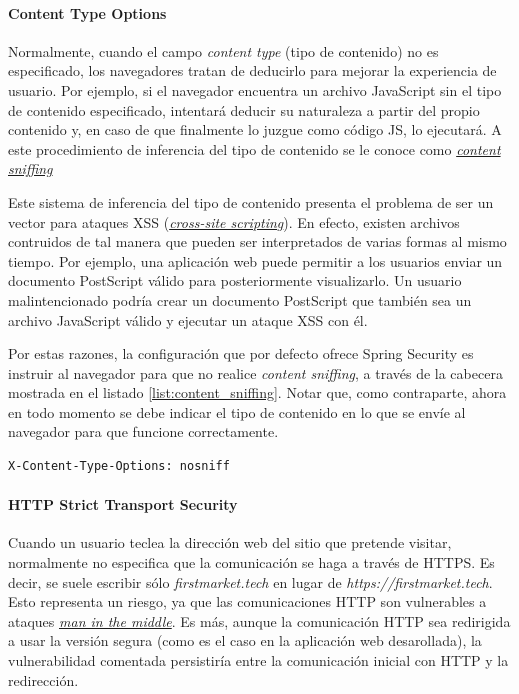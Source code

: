 \documentclass[a4paper]{article}
\begin{document}
	\paragraph{Content Type Options}
	Normalmente, cuando el campo \emph{content type} (tipo de contenido) no es especificado, los navegadores tratan de deducirlo para mejorar la experiencia de usuario. Por ejemplo, si el navegador encuentra un archivo JavaScript sin el tipo de contenido especificado, intentará deducir su naturaleza a partir del propio contenido y, en caso de que finalmente lo juzgue como código JS, lo ejecutará. A este procedimiento de inferencia del tipo de contenido se le conoce como \href{https://en.wikipedia.org/wiki/Content_sniffing}{\emph{content sniffing}}
	
	Este sistema de inferencia del tipo de contenido presenta el problema de ser un vector para ataques XSS (\href{https://owasp.org/www-community/attacks/xss/}{\emph{cross-site scripting}}). En efecto, existen archivos contruidos de tal manera que pueden ser interpretados de varias formas al mismo tiempo. Por ejemplo, una aplicación web puede permitir a los usuarios enviar un documento PostScript válido para posteriormente visualizarlo. Un usuario malintencionado podría crear un documento PostScript que también sea un archivo JavaScript válido y ejecutar un ataque XSS con él.
	
	Por estas razones, la configuración que por defecto ofrece Spring Security es instruir al navegador para que no realice \emph{content sniffing}, a través de la cabecera mostrada en el listado \ref{list:content_sniffing}. Notar que, como contraparte, ahora en todo momento se debe indicar el tipo de contenido en lo que se envíe al navegador para que funcione correctamente.
	\\
	
	\begin{lstlisting}[caption=Cabecera para impedir el \emph{content sniffing}, label=list:content_sniffing]
	X-Content-Type-Options: nosniff
	\end{lstlisting}
	
	\paragraph{HTTP Strict Transport Security}
	Cuando un usuario teclea la dirección web del sitio que pretende visitar, normalmente no especifica que la comunicación se haga a través de HTTPS. Es decir, se suele escribir sólo \emph{firstmarket.tech} en lugar de \emph{https://firstmarket.tech}. Esto representa un riesgo, ya que las comunicaciones HTTP son vulnerables a ataques \href{https://en.wikipedia.org/wiki/Man-in-the-middle_attack}{\emph{man in the middle}}. Es más, aunque la comunicación HTTP sea redirigida a usar la versión segura (como es el caso en la aplicación web desarollada), la vulnerabilidad comentada persistiría entre la comunicación inicial con HTTP y la redirección.
	
\end{document}
